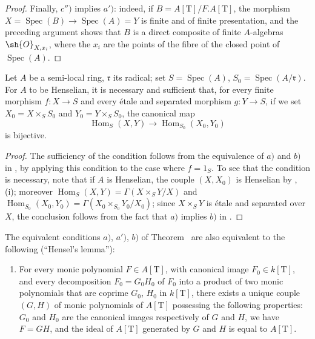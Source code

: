 \begin{proof}
Finally, $c'')$ implies $a')$:
indeed, if $B=A[\mathrm{T}]/F.A[\mathrm{T}]$, the morphism $X=\operatorname{Spec}(B)\to\operatorname{Spec}(A)=Y$ is finite and of finite presentation, and the preceding argument shows that $B$ is a direct composite of finite $A$-algebras $\sh{O}_{X,x_i}$, where the $x_i$ are the points of the fibre of the closed point of $\operatorname{Spec}(A)$.
\end{proof}

\begin{corollary}[18.5.12]
\label{IV.18.5.12}
Let $A$ be a semi-local ring, $\mathfrak{r}$ its radical;
set $S=\operatorname{Spec}(A)$, $S_0=\operatorname{Spec}(A/\mathfrak{r})$.
For $A$ to be Henselian, it is necessary and sufficient that, for every finite morphism $f:X\to S$ and every \'etale and separated morphism $g:Y\to S$, if we set $X_0=X\times_S S_0$ and $Y_0=Y\times_S S_0$, the canonical map
\[
\operatorname{Hom}_S(X,Y)\to\operatorname{Hom}_{S_0}(X_0,Y_0)
\]
is bijective.
\end{corollary}

\begin{proof}
The sufficiency of the condition follows from the equivalence of $a)$ and $b)$ in , by applying this condition to the case where $f=1_S$.
To see that the condition is necessary, note that if $A$ is Henselian, the couple $(X,X_0)$ is Henselian by , (i);
moreover $\operatorname{Hom}_S(X,Y)=\Gamma(X\times_S Y/X)$ and $\operatorname{Hom}_{S_0}(X_0,Y_0)=\Gamma(X_0\times_{S_0}Y_0/X_0)$;
since $X\times_S Y$ is \'etale and separated over $X$, the conclusion follows from the fact that $a)$ implies $b)$ in .
\end{proof}

\begin{remarks}[18.5.13]
\label{IV.18.5.13}
The equivalent conditions $a)$, $a')$, $b)$ of Theorem~ are also equivalent to the following (``Hensel's lemma''):
\begin{enumerate}
  \item[a$''$)] For every monic polynomial $F\in A[\mathrm{T}]$, with canonical image $F_0\in k[\mathrm{T}]$, and every decomposition $F_0=G_0 H_0$ of $F_0$ into a product of two monic polynomials that are coprime $G_0$, $H_0$ in $k[\mathrm{T}]$, there exists a unique couple $(G,H)$ of monic polynomials of $A[\mathrm{T}]$ possessing the following properties:
$G_0$ and $H_0$ are the canonical images respectively of $G$ and $H$, we have $F=GH$, and the ideal of $A[\mathrm{T}]$ generated by $G$ and $H$ is equal to $A[\mathrm{T}]$.
\end{enumerate}
\end{remarks}

